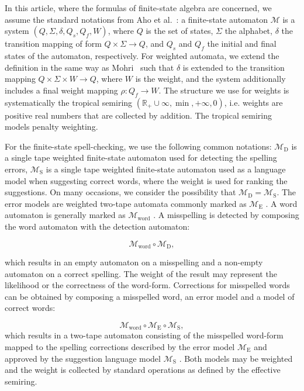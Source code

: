 \documentclass[postprint]{flammie}
\begin{document}
In this article, where the formulas of finite-state algebra are concerned, we
assume the standard notations from Aho et al.~\cite{aho2007compilers}: a
finite-state automaton $\mathcal{M}$ is a system $(Q, \Sigma, \delta, Q_s, Q_f,
W)$, where $Q$ is the set of states, $\Sigma$ the alphabet, $\delta$ the
transition mapping of form $Q \times \Sigma \rightarrow Q$, and $Q_s$ and $Q_f$
the initial and final states of the automaton, respectively. For weighted
automata, we extend the definition in the same way as
Mohri~\cite{mohri2009weighted} such that $\delta$ is extended to the transition
mapping $Q × \Sigma × W \rightarrow Q$, where $W$ is the weight, and the system
additionally includes a final weight mapping $\rho: Q_f \rightarrow W$. The
structure we use for weights is systematically the tropical semiring
$(\mathbb{R}_+ \cup \infty, \min, +\infty, 0)$, i.e. weights are positive real
numbers that are collected by addition. The tropical semiring models penalty
weighting.

For the finite-state spell-checking, we use the following common notations:
$\mathcal{M}_\mathrm{D}$ is
a single tape weighted finite-state automaton used for detecting the spelling errors, $\mathcal{M}_\mathrm{S}$
is a single tape weighted finite-state automaton used as a language model when
suggesting correct words, where the weight is used for ranking the suggestions. On
many occasions, we consider the possibility that
$\mathcal{M}_\mathrm{D} = \mathcal{M}_\mathrm{S}$. The error models are
weighted two-tape automata commonly marked as $\mathcal{M}_\mathrm{E}$
. A word automaton is generally marked as $\mathcal{M}_\mathrm{word}$
. A misspelling is detected by composing the word automaton
with the detection automaton:

\begin{equation}
    \mathcal{M}_{\mathrm{word}} \circ \mathcal{M}_\mathrm{D},
\end{equation}


which results in an empty automaton on a misspelling and a non-empty automaton
on a correct spelling. The weight of the result may represent the likelihood or
the correctness of the word-form. Corrections for misspelled words can be
obtained by composing a misspelled word, an error model and a model of
correct words:

\begin{equation}
    \mathcal{M}_{\mathrm{word}} \circ \mathcal{M}_{\mathrm{E}} \circ \mathcal{M}_{\mathrm{S}},
\end{equation}
which results in a two-tape automaton consisting of the misspelled word-form
mapped to the spelling corrections described by the error model
 $\mathcal{M}_\mathrm{E}$ 
 and approved by the suggestion language model $\mathcal{M}_\mathrm{S}$
. Both models may be weighted and the weight is
collected by standard operations as defined by the effective semiring.
\end{document}
